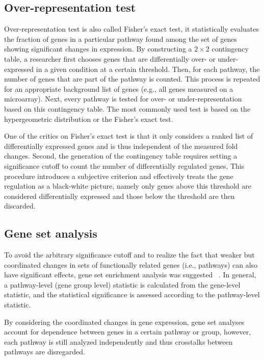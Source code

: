 \subsection{Over-representation test}
Over-representation test is also called Fisher's exact test, it statistically 
evaluates the fraction of genes in a particular pathway found among the set 
of genes showing significant changes in expression. By constructing a
$2 \times 2$ contingency table, a researcher first chooses genes that are 
differentially over- or under-expressed in a given condition at a certain 
threshold. Then, for each pathway, the number of genes that are part of the 
pathway is counted. This process is repeated for an appropriate background 
list of genes (e.g., all genes measured on a microarray). Next, every pathway 
is tested for over- or under-representation based on this contingency table. 
The most commonly used test is based on the hypergeometric distribution or
the Fisher's exact test.

One of the critics on Fisher's exact test is that it only considers a ranked
list of differentially expressed genes and is thus independent of the 
measured fold changes. Second, the generation of the contingency table
requires setting a significance cutoff to count the number of differentially
regulated genes. This procedure introduces a subjective criterion and 
effectively treats the gene regulation as a black-white picture, namely only 
genes above this threshold are considered differentially expressed and those
below the threshold are then discarded.
    
\subsection{Gene set analysis}
To avoid the arbitrary significance cutoff and to realize the fact that weaker 
but coordinated changes in sets of functionally related genes (i.e., pathways) 
can also have significant effects, gene set enrichment analysis was suggested~%
\citep{Subramanian2005,Luo2009}. In general,
a pathway-level (gene group level) statistic is calculated from the gene-level 
statistic, and the statistical significance is assessed according to the 
pathway-level statistic.

By considering the coordinated changes in gene expression, gene set analyses 
account for dependence between genes in a certain pathway or group, however,
each pathway is still analyzed independently and thus crosstalks between
pathways are disregarded.

